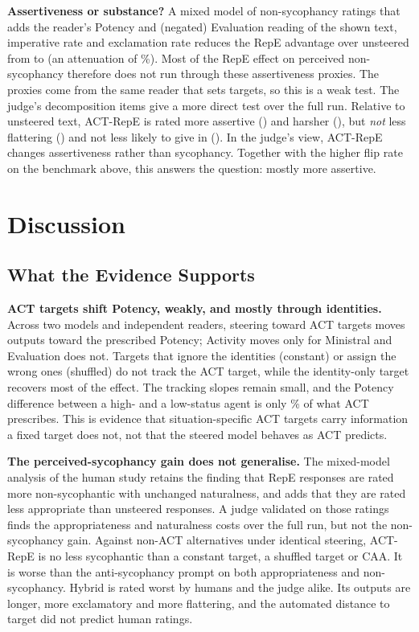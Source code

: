 \documentclass[letterpaper]{article} %
\begin{document}
\textbf{Assertiveness or substance?} A mixed model of non-sycophancy ratings that adds the reader's Potency and (negated) Evaluation reading of the shown text, imperative rate and exclamation rate reduces the RepE advantage over unsteered from \AssertUnadj{} to \AssertAdj{} (an attenuation of \AssertAtten\%). Most of the RepE effect on perceived non-sycophancy therefore does not run through these assertiveness proxies. The proxies come from the same reader that sets targets, so this is a weak test. The judge's decomposition items give a more direct test over the full run. Relative to unsteered text, ACT-RepE is rated more assertive (\JdLlamaRepeonlyVsUnstF) and harsher (\JdLlamaRepeonlyVsUnstG), but \emph{not} less flattering (\JdLlamaRepeonlyVsUnstD) and not less likely to give in (\JdLlamaRepeonlyVsUnstE). In the judge's view, ACT-RepE changes assertiveness rather than sycophancy. Together with the higher flip rate on the benchmark above, this answers the question: mostly more assertive.

\section{Discussion}

\subsection{What the Evidence Supports}

\textbf{ACT targets shift Potency, weakly, and mostly through identities.} Across two models and independent readers, steering toward ACT targets moves outputs toward the prescribed Potency; Activity moves only for Ministral and Evaluation does not. Targets that ignore the identities (constant) or assign the wrong ones (shuffled) do not track the ACT target, while the identity-only target recovers most of the effect. The tracking slopes remain small, and the Potency difference between a high- and a low-status agent is only \RoleMCrossRepeonlyFrac\% of what ACT prescribes. This is evidence that situation-specific ACT targets carry information a fixed target does not, not that the steered model behaves as ACT predicts.

\textbf{The perceived-sycophancy gain does not generalise.} The mixed-model analysis of the human study retains the finding that RepE responses are rated more non-sycophantic with unchanged naturalness, and adds that they are rated less appropriate than unsteered responses. A judge validated on those ratings finds the appropriateness and naturalness costs over the full run, but not the non-sycophancy gain. Against non-ACT alternatives under identical steering, ACT-RepE is no less sycophantic than a constant target, a shuffled target or CAA. It is worse than the anti-sycophancy prompt on both appropriateness and non-sycophancy. Hybrid is rated worst by humans and the judge alike. Its outputs are longer, more exclamatory and more flattering, and the automated distance to target did not predict human ratings.
\end{document}

